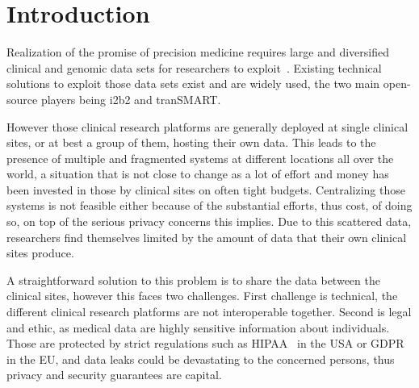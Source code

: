 


\chapter{Introduction}

Realization of the promise of precision medicine requires large and diversified clinical and genomic data sets for researchers to exploit~\cite{todo1}.
Existing technical solutions to exploit those data sets exist and are widely used, the two main open-source players being i2b2 and tranSMART.

However those clinical research platforms are generally deployed at single clinical sites, or at best a group of them, hosting their own data.
This leads to the presence of multiple and fragmented systems at different locations all over the world, a situation that is not close to change as a lot of effort and money has been invested in those by clinical sites on often tight budgets.
Centralizing those systems is not feasible either because of the substantial efforts, thus cost, of doing so, on top of the serious privacy concerns this implies.
Due to this scattered data, researchers find themselves limited by the amount of data that their own clinical sites produce.

A straightforward solution to this problem is to share the data between the clinical sites, however this faces two challenges.
First challenge is technical, the different clinical research platforms are not interoperable together.
Second is legal and ethic, as medical data are highly sensitive information about individuals.
Those are protected by strict regulations such as HIPAA~\cite{todo} in the USA or GDPR~\cite{todo} in the EU, and data leaks could be devastating to the concerned persons, thus privacy and security guarantees are capital.

